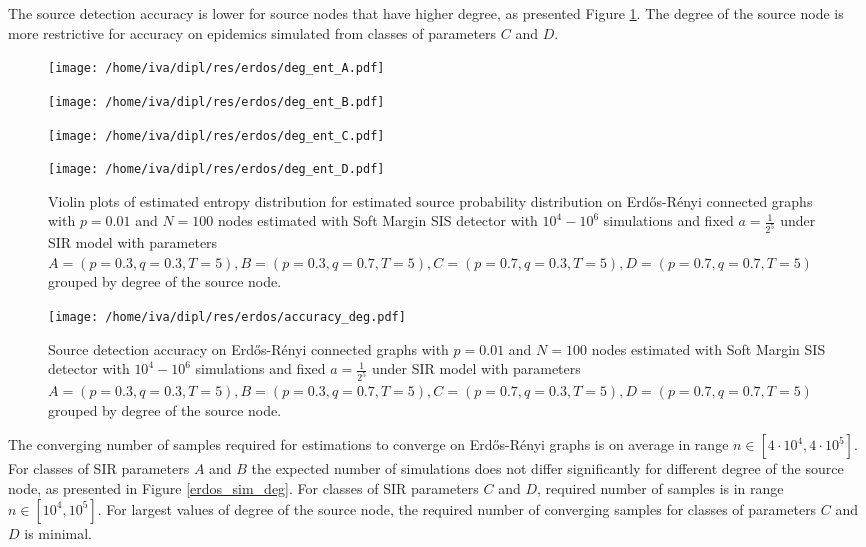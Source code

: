 \documentclass[times, utf8, diplomski]{fer}
\begin{document}
The source detection accuracy is lower for source nodes that have higher degree, as presented Figure \ref{deg_acc}.  The degree of the source node is more restrictive for accuracy on epidemics simulated from classes of parameters $C$ and $D$. 

\begin{figure}[H]
\begin{minipage}{\textwidth}
\begin{minipage}{0.5\textwidth}
\texttt{[image: /home/iva/dipl/res/erdos/deg\_ent\_A.pdf]}
\end{minipage}
\begin{minipage}{0.5\textwidth}
\texttt{[image: /home/iva/dipl/res/erdos/deg\_ent\_B.pdf]}
\end{minipage}
\begin{minipage}{0.5\textwidth}
\texttt{[image: /home/iva/dipl/res/erdos/deg\_ent\_C.pdf]}
\end{minipage}
\begin{minipage}{0.5\textwidth}
\texttt{[image: /home/iva/dipl/res/erdos/deg\_ent\_D.pdf]}
\end{minipage}
\caption{Violin plots of estimated entropy distribution for estimated source probability distribution on  Erd{\H{o}}s-R{\'{e}}nyi connected graphs with $p=0.01$ and $N=100$ nodes estimated with Soft Margin SIS detector with $10^4 - 10^6$ simulations and fixed $a = \frac{1}{2^5}$ under SIR model with parameters $A = (p=0.3, q=0.3, T=5), B = (p=0.3, q=0.7, T=5), C = (p=0.7, q=0.3, T=5), D = (p=0.7, q=0.7, T=5)$ grouped by degree of the source node.}
\label{deg_ent}
\end{minipage}
\begin{minipage}{\textwidth}
\center
\texttt{[image: /home/iva/dipl/res/erdos/accuracy\_deg.pdf]}
\caption{Source detection accuracy on  Erd{\H{o}}s-R{\'{e}}nyi connected graphs with $p=0.01$ and $N=100$ nodes estimated with Soft Margin SIS detector with $10^4 - 10^6$ simulations and fixed $a = \frac{1}{2^5}$ under SIR model with parameters $A = (p=0.3, q=0.3, T=5), B = (p=0.3, q=0.7, T=5), C = (p=0.7, q=0.3, T=5), D = (p=0.7, q=0.7, T=5)$ grouped by degree of the source node.}
\label{deg_acc}
\end{minipage}
\end{figure}

The converging number of samples required for estimations to converge on  Erd{\H{o}}s-R{\'{e}}nyi graphs is on average in range  $n \in [4 \cdot  10^4, 4 \cdot 10^5]$.  For classes of SIR parameters $A$ and $B$ the expected number of simulations does not  differ significantly  for different degree of the source node, as presented in Figure \ref{erdos_sim_deg}. For classes of SIR parameters $C$ and $D$, required number of samples is in range $n \in [10^4, 10^5 ] $.  For largest values of degree of the source node, the required number of converging samples for classes of parameters $C$ and $D$ is minimal. 
\end{document}
